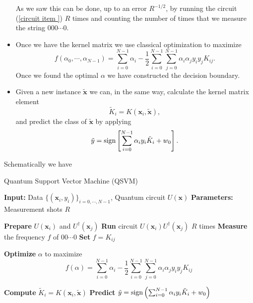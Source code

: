 \documentclass[12pt]{article}
\begin{document}
\begin{itemize}
    As we saw this can be done, up to an error $R^{-1/2}$, by running the circuit (\ref{circuit item }) $R$ times and counting the number of times that we measure the string $000\cdots 0$.
    \item Once we have the kernel matrix we use classical optimization to maximize
    \begin{equation}
        f(\alpha_0,\cdots,\alpha_{N-1})=\sum_{i=0}^{N-1} \alpha_i-\frac{1}{2}\sum_{i=0}^{N-1}\sum_{j=0}^{N-1}\alpha_i\alpha_jy_iy_jK_{ij}.
        \label{loss function}
    \end{equation}
    Once we found the optimal $\alpha$ we have constructed the decision boundary.
    \item Given a new instance $\tilde{\mathbf{x}}$ we can, in the same way, calculate the kernel matrix element $$\tilde{K}_i=K(\mathbf{x}_i, \tilde{\mathbf{x}}),$$ and predict the class of $\tilde{\mathbf{x}}$ by applying \begin{equation}
        \tilde{y}=\textup{sign}\left[\sum_{i=0}^{N-1}\alpha_iy_i\tilde{K}_i+w_0\right].
    \end{equation}
\end{itemize}

Schematically we have 

\begin{algorithm}[H]
    \caption{Quantum Support Vector Machine (QSVM)}
    \begin{algorithmic}[1]
        \State \textbf{Input:} Data $\{(\mathbf{x}_i, y_i)\}_{i=0,\cdots,N-1}$, Quantum circuit $U(\mathbf{x})$
        \State \textbf{Parameters:} Measurement shots $R$
        
                \State \textbf{Prepare} $U(\mathbf{x}_i)$ and $U^\dagger(\mathbf{x}_j)$
                \State \textbf{Run} circuit $U(\mathbf{x}_i)U^\dagger(\mathbf{x}_j)$ $R$ times  
                \State \textbf{Measure} the frequency $f$ of $00\cdots 0$ 
                \State \textbf{Set} $f=K_{ij}$ 
            \EndFor
        \EndFor
        
        \State \textbf{Optimize} $\alpha$ to maximize
        \begin{equation*}
            f(\alpha) = \sum_{i=0}^{N-1} \alpha_i - \frac{1}{2} \sum_{i=0}^{N-1} \sum_{j=0}^{N-1} \alpha_i \alpha_j y_i y_j K_{ij}
        \end{equation*}
    
            \State \textbf{Compute} $\tilde{K}_i = K(\mathbf{x}_i, \tilde{\mathbf{x}})$
            \State \textbf{Predict} $\tilde{y} = \textup{sign}\left(\sum_{i=0}^{N-1} \alpha_i y_i \tilde{K}_i + w_0\right)$
        \EndFor
        
    \end{algorithmic}
    \end{algorithm}
\end{document}
